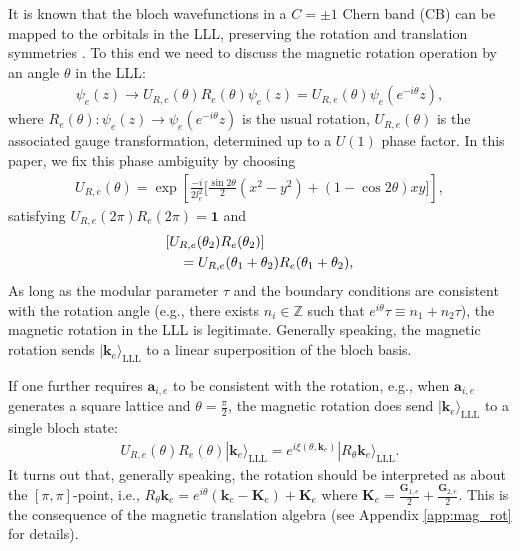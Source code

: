 It is known that the bloch wavefunctions in a $C=\pm 1$ Chern band (CB) can be mapped to the orbitals in the LLL, preserving the rotation and translation symmetries \cite{jian2013crystal}. To this end we need to discuss the magnetic rotation operation by an angle $\theta$ in the LLL:
\begin{align}
\psi_e(z)\rightarrow U_{R,e}(\theta)R_e(\theta)\psi_e(z)=U_{R,e}(\theta)\psi_e(e^{-i\theta}z),
\end{align}
where $R_e(\theta): \psi_e(z)\rightarrow \psi_e(e^{-i\theta}z)$ is the usual rotation, $U_{R,e}(\theta)$ is the associated gauge transformation, determined up to a $U(1)$ phase factor. In this paper, we fix this phase ambiguity by choosing
\begin{align}
U_{R,e}(\theta)=\exp\left[\frac{-i}{2l_e^2}\Big[\frac{\sin2\theta}{2}(x^2-y^2)+(1-\cos2\theta)xy\Big]\right],\label{eq:U_R}
\end{align}
satisfying $U_{R,e}(2\pi)R_e(2\pi)=\mathbf 1$ and
\begin{align}
 [U_{R,e}(\theta_1)R_e(\theta_1)]&[U_{R,e}(\theta_2)R_e(\theta_2)]\notag\\
 &\quad=U_{R,e}(\theta_1+\theta_2)R_e(\theta_1+\theta_2),\label{eq:U_R_identity}
\end{align}
As long as the modular parameter $\tau$ and the boundary conditions are consistent with the rotation angle (e.g., there exists $n_i\in\mathbb Z$ such that $e^{i\theta}\tau\equiv n_1+n_2\tau$), the magnetic rotation in the LLL is legitimate. Generally speaking, the magnetic rotation sends $|\mathbf k_e\rangle_{\text{LLL}}$ to a linear superposition of the bloch basis. 

If one further requires $\mathbf a_{i,e}$ to be consistent with the rotation, e.g., when $\mathbf a_{i,e}$ generates a square lattice and $\theta=\frac{\pi}{2}$, the magnetic rotation does send $|\mathbf k_e\rangle_{\text{LLL}}$ to a single bloch state:
\begin{align}
U_{R,e}(\theta)R_e(\theta)|\mathbf k_e\rangle_{\text{LLL}}=e^{i \xi(\theta,\mathbf k_e)}|R_{\theta}\mathbf k_e\rangle_{\text{LLL}}.\label{eq:R_trans}
\end{align}
It turns out that, generally speaking, the rotation should be interpreted as about the $[\pi,\pi]$-point, i.e., $R_{\theta}\mathbf k_e=e^{i\theta}(\mathbf k_e-\mathbf K_e)+\mathbf K_e$ where $\mathbf K_e=\frac{\mathbf G_{1,e}}{2}+\frac{\mathbf G_{2,e}}{2}$. This is the consequence of the magnetic translation algebra (see Appendix \ref{app:mag_rot} for details).

